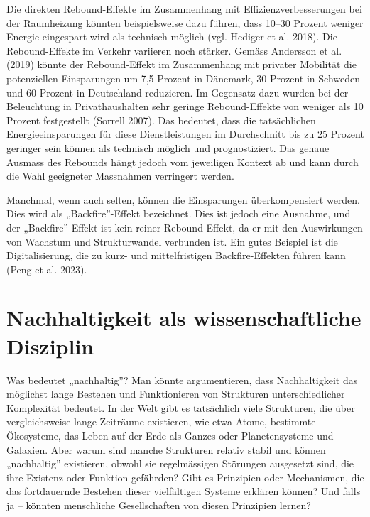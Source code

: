 \documentclass[
  nswissgerman,
  a4paper,
  DIV=11,
  numbers=noendperiod,
  oneside,
  openany]{scrreprt}
\begin{document}
Die direkten Rebound-Effekte im Zusammenhang mit Effizienzverbesserungen
bei der Raumheizung könnten beispielsweise dazu führen, dass 10--30
Prozent weniger Energie eingespart wird als technisch möglich (vgl.
Hediger et al. 2018). Die Rebound-Effekte im Verkehr variieren noch
stärker. Gemäss Andersson et al. (2019) könnte der Rebound-Effekt im
Zusammenhang mit privater Mobilität die potenziellen Einsparungen um 7,5
Prozent in Dänemark, 30 Prozent in Schweden und 60 Prozent in
Deutschland reduzieren. Im Gegensatz dazu wurden bei der Beleuchtung in
Privathaushalten sehr geringe Rebound-Effekte von weniger als 10 Prozent
festgestellt (Sorrell 2007). Das bedeutet, dass die tatsächlichen
Energieeinsparungen für diese Dienstleistungen im Durchschnitt bis zu 25
Prozent geringer sein können als technisch möglich und prognostiziert.
Das genaue Ausmass des Rebounds hängt jedoch vom jeweiligen Kontext ab
und kann durch die Wahl geeigneter Massnahmen verringert werden.

Manchmal, wenn auch selten, können die Einsparungen überkompensiert
werden. Dies wird als „Backfire''-Effekt bezeichnet. Dies ist jedoch
eine Ausnahme, und der „Backfire''-Effekt ist kein reiner
Rebound-Effekt, da er mit den Auswirkungen von Wachstum und
Strukturwandel verbunden ist. Ein gutes Beispiel ist die
Digitalisierung, die zu kurz- und mittelfristigen Backfire-Effekten
führen kann (Peng et al. 2023).

\section{Nachhaltigkeit als wissenschaftliche
Disziplin}\label{nachhaltigkeit-als-wissenschaftliche-disziplin}

Was bedeutet „nachhaltig''? Man könnte argumentieren, dass
Nachhaltigkeit das möglichst lange Bestehen und Funktionieren von
Strukturen unterschiedlicher Komplexität bedeutet. In der Welt gibt es
tatsächlich viele Strukturen, die über vergleichsweise lange Zeiträume
existieren, wie etwa Atome, bestimmte Ökosysteme, das Leben auf der Erde
als Ganzes oder Planetensysteme und Galaxien. Aber warum sind manche
Strukturen relativ stabil und können „nachhaltig'' existieren, obwohl
sie regelmässigen Störungen ausgesetzt sind, die ihre Existenz oder
Funktion gefährden? Gibt es Prinzipien oder Mechanismen, die das
fortdauernde Bestehen dieser vielfältigen Systeme erklären können? Und
falls ja -- könnten menschliche Gesellschaften von diesen Prinzipien
lernen?
\end{document}
